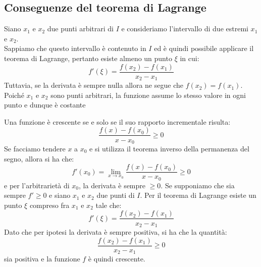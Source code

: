 \documentclass{report}
\begin{document}
\subsection{Conseguenze del teorema di Lagrange}
\begin{myproof}
Siano $x_1$ e $x_2$ due punti arbitrari di $I$ e consideriamo l'intervallo di due estremi $x_1$ e $x_2$. \\
Sappiamo che questo intervallo è contenuto in $I$ ed è quindi possibile applicare il teorema di Lagrange, pertanto esiste almeno un punto $\xi$ in cui:
$$
	f'(\xi) = \frac{f(x_2)-f(x_1)}{x_2 - x_1}
$$
Tuttavia, se la derivata è sempre nulla allora ne segue che $f(x_2) = f(x_1)$. Poiché $x_1$ e $x_2$ sono punti arbitrari, la funzione assume lo stesso valore in ogni punto e dunque è costante
\end{myproof}
\begin{myproof}
Una funzione è crescente se e solo se il suo rapporto incrementale risulta:
$$
	\frac{f(x)-f(x_0)}{x - x_0} \geq 0
$$
Se facciamo tendere $x$ a $x_0$ e si utilizza il teorema inverso della permanenza del segno, allora si ha che:
$$
	f'(x_0) = \lim_{x \to x_0} \frac{f(x)-f(x_0)}{x-x_0} \geq 0
$$
e per l'arbitrarietà di $x_0$, la derivata è sempre $\geq 0$. 
Se supponiamo che sia sempre $f' \geq 0$ e siano $x_1$ e $x_2$ due punti di $I$. Per il teorema di Lagrange esiste un punto $\xi$ compreso fra $x_1$ e $x_2$ tale che:
$$
	f'(\xi) = \frac{f(x_2)-f(x_1)}{x_2 - x_1}
$$
Dato che per ipotesi la derivata è sempre positiva, si ha che la quantità:
$$
	\frac{f(x_2) - f(x_1)}{x_2 - x_1} \geq 0
$$
sia positiva e la funzione $f$ è quindi crescente.
\end{myproof}
\end{document}
